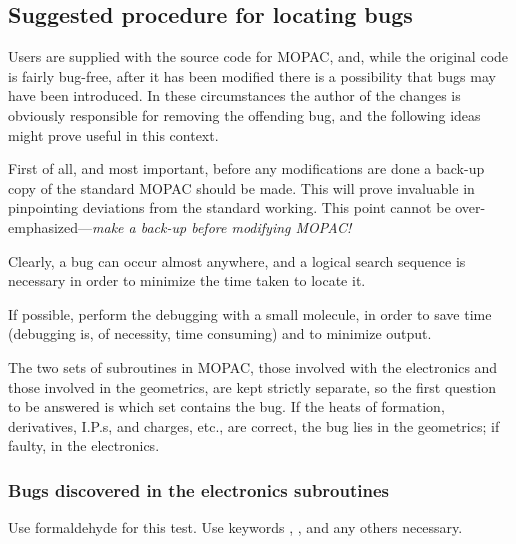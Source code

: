                     
\subsection*{Suggested procedure for locating bugs}
Users are supplied with the source code for MOPAC, and,  while  the original 
code is fairly bug-free, after it has been modified there is a possibility that
bugs may have been introduced.  In these  circumstances the  author  of  the 
changes  is obviously responsible for removing the offending bug, and the 
following  ideas  might  prove  useful  in  this context.

First of all, and most important, before any modifications are done a  back-up 
copy  of the standard MOPAC should be made.  This will prove invaluable in
pinpointing deviations from the  standard  working.   This point  cannot  be 
over-emphasized---{\em make  a  back-up before modifying MOPAC!}

Clearly, a bug can occur almost  anywhere,  and  a  logical  search sequence is
necessary in order to minimize the time taken to locate it.

If possible, perform the debugging with a small molecule, in  order to  save 
time  (debugging  is,  of  necessity,  time  consuming) and to minimize output.

The two sets of subroutines  in  MOPAC,  those  involved  with  the
electronics  and  those  involved  in  the geometrics, are kept strictly
separate, so the first question to be answered is which set contains the bug.  
If the heats of formation, derivatives, I.P.s, and charges, etc., are correct, 
the  bug  lies  in  the  geometrics;  if  faulty,  in  the electronics.

        
\subsubsection{Bugs discovered in the electronics subroutines}
Use formaldehyde for this test.  Use keywords , , and 
any others necessary.

